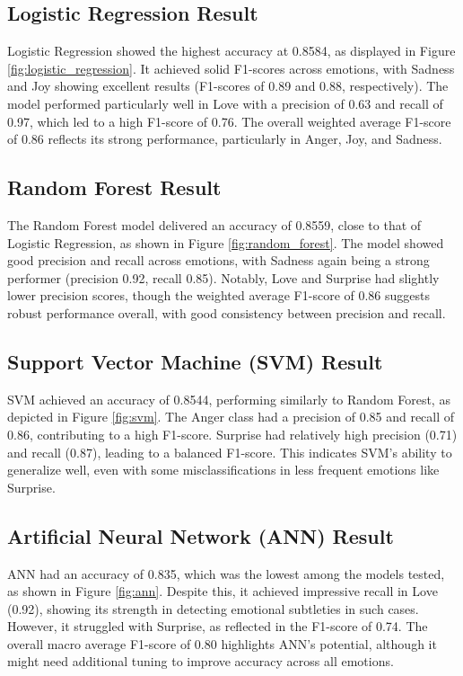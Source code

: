 \subsection{Logistic Regression Result}
Logistic Regression showed the highest accuracy at 0.8584, as displayed in Figure \ref{fig:logistic_regression}. It achieved solid F1-scores across emotions, with Sadness and Joy showing excellent results (F1-scores of 0.89 and 0.88, respectively). The model performed particularly well in Love with a precision of 0.63 and recall of 0.97, which led to a high F1-score of 0.76. The overall weighted average F1-score of 0.86 reflects its strong performance, particularly in Anger, Joy, and Sadness.

\subsection{Random Forest Result}
The Random Forest model delivered an accuracy of 0.8559, close to that of Logistic Regression, as shown in Figure \ref{fig:random_forest}. The model showed good precision and recall across emotions, with Sadness again being a strong performer (precision 0.92, recall 0.85). Notably, Love and Surprise had slightly lower precision scores, though the weighted average F1-score of 0.86 suggests robust performance overall, with good consistency between precision and recall.

\subsection{Support Vector Machine (SVM) Result}
SVM achieved an accuracy of 0.8544, performing similarly to Random Forest, as depicted in Figure \ref{fig:svm}. The Anger class had a precision of 0.85 and recall of 0.86, contributing to a high F1-score. Surprise had relatively high precision (0.71) and recall (0.87), leading to a balanced F1-score. This indicates SVM's ability to generalize well, even with some misclassifications in less frequent emotions like Surprise.

\subsection{Artificial Neural Network (ANN) Result}
ANN had an accuracy of 0.835, which was the lowest among the models tested, as shown in Figure \ref{fig:ann}. Despite this, it achieved impressive recall in Love (0.92), showing its strength in detecting emotional subtleties in such cases. However, it struggled with Surprise, as reflected in the F1-score of 0.74. The overall macro average F1-score of 0.80 highlights ANN's potential, although it might need additional tuning to improve accuracy across all emotions.

